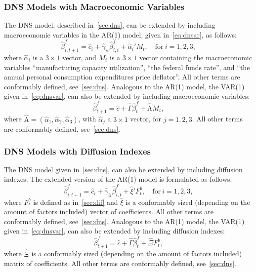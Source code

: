\subsubsection{DNS Models with Macroeconomic Variables}
\label{sec:dnsmv}
The DNS model, described in~\cref{sec:dns}, can be extended by including macroeconomic variables in the AR(1) model, given in~\cref{eq:dnsar}, as follows:
\begin{equation}
	\hat{\beta}_{i,t+1}^{f} = \hat{c}_i + \hat{\gamma}_{ii} \hat{\beta}_{i,t}^f + \hat{\alpha}_i' M_t, \quad \text{for}~i = 1,2,3,
\end{equation}
where $\hat{\alpha}_i$ is a $3 \times 1$ vector, and $M_t$ is a $3 \times 1$ vector containing the macroeconomic variables \enquote{manufacturing capacity utilization}, \enquote{the federal funds rate}, and \enquote{the annual personal consumption expenditures price deflator}. 
All other terms are conformably defined, see~\cref{sec:dns}. 
Analogous to the AR(1) model, the VAR(1) given in~\cref{eq:dnsvar}, can also be extended by including macroeconomic variables:
\begin{equation}
	\hat{\beta}_{t+1}^{f} = \hat{c} + \hat{\Gamma} \hat{\beta}_t^f + \hat{\mathrm{A}} M_t,
\end{equation}
where $\hat{\mathrm{A}} = \left(\hat{\alpha}_1, \hat{\alpha}_2, \hat{\alpha}_3 \right)$, with $\hat{\alpha}_j$ a $3 \times 1$ vector, for $j = 1,2,3$. 
All other terms are conformably defined, see~\cref{sec:dns}.

\subsubsection{DNS Models with Diffusion Indexes}
\label{sec:dnsdif}
The DNS model given in~\cref{sec:dns}, can also be extended by including diffusion indexes. The extended version of the AR(1) model is formulated as follows:
\begin{equation}
	\hat{\beta}_{i,t+1}^{f} = \hat{c}_i + \hat{\gamma}_{ii} \hat{\beta}_{i,t}^f + \hat{\xi}' F_t^b, \quad \text{for}~i = 1,2,3,
\end{equation}
where $F_t^b$ is defined as in~\cref{sec:dif} and $\hat{\xi}$ is a conformably sized (depending on the amount of factors included) vector of coefficients. 
All other terms are conformably defined, see~\cref{sec:dns}. 
Analogous to the AR(1) model, the VAR(1) given in~\cref{eq:dnsvar}, can also be extended by including diffusion indexes:
\begin{equation}
	\hat{\beta}_{t+1}^{f} = \hat{c} + \hat{\Gamma} \hat{\beta}_t^f + \hat{\Xi} F_t^b,
\end{equation}
where $\hat{\Xi}$ is a conformably sized (depending on the amount of factors included) matrix of coefficients. 
All other terms are conformably defined, see~\cref{sec:dns}.

